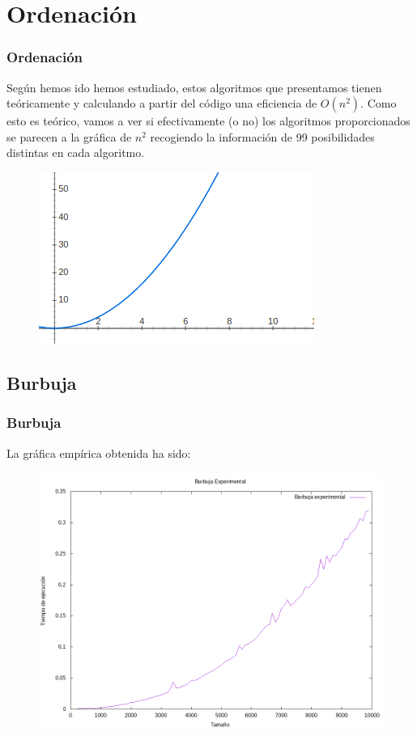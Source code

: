 \documentclass{beamer}
\begin{document}
\section{Ordenación} %
\begin{frame}
	\frametitle{Ordenación}
	Según hemos ido hemos estudiado, estos algoritmos que presentamos tienen teóricamente y calculando a partir del código una eficiencia de $O(n^2 )$. Como esto es teórico, vamos a ver si efectivamente (o no) los algoritmos proporcionados se parecen a la gráfica de $n^2$ recogiendo la información de 99 posibilidades distintas en cada algoritmo.
	\begin{figure}
		\centering
		\includegraphics[width=0.7\linewidth]{imagenes/enecuadrado.png}
		\caption{}
		\label{fig:E1}
	\end{figure}

\end{frame}

\subsection{Burbuja}
\begin{frame}
	\frametitle{Burbuja}
	La gráfica empírica obtenida ha sido:
	\begin{figure}
		\centering
		\includegraphics[width=0.7\linewidth]{imagenes/burbuja-experimental.png}
		\caption{}
		\label{fig:E2}
	\end{figure}
	
\end{frame}
\end{document}
